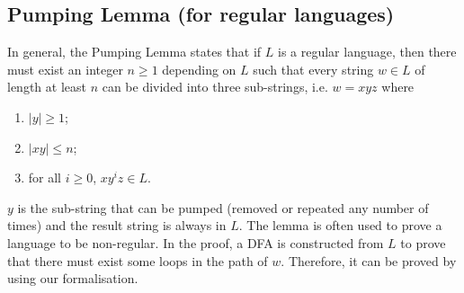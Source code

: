 \subsection{Pumping Lemma (for regular languages)}
\par In general, the
Pumping Lemma states that if \(L\) is a regular language, then there
must exist an integer \(n \geq 1\) depending on \(L\) such that every
string \(w \in L\) of length at least \(n\) can be divided into three
sub-strings, i.e. \(w = xyz\) where
\begin{enumerate}[nolistsep]
  \item \(|y| \geq 1\);
  \item \(|xy| \leq n\);
  \item for all \(i \geq 0\), \(xy^iz \in L\).
\end{enumerate}
\par \(y\) is the sub-string that can be pumped (removed or repeated
any number of times) and the result string is always in \(L\). The
lemma is often used to prove a language to be non-regular. In the proof, a DFA is constructed from \(L\) to prove that there
must exist some loops in the path of \(w\). Therefore, it can be
proved by using our formalisation. 